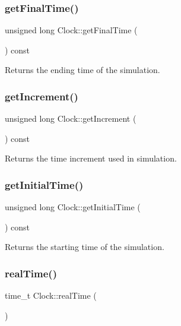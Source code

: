 \subsubsection{\texorpdfstring{get\+Final\+Time()}{getFinalTime()}}
{\footnotesize\ttfamily unsigned long Clock\+::get\+Final\+Time (\begin{DoxyParamCaption}{ }\end{DoxyParamCaption}) const}

\begin{DoxyReturn}{Returns}
the ending time of the simulation. 
\end{DoxyReturn}
\mbox{\label{class_clock_a804626d5455f4a2a73321f84ed7a9819}} 
\subsubsection{\texorpdfstring{get\+Increment()}{getIncrement()}}
{\footnotesize\ttfamily unsigned long Clock\+::get\+Increment (\begin{DoxyParamCaption}{ }\end{DoxyParamCaption}) const}

\begin{DoxyReturn}{Returns}
the time increment used in simulation. 
\end{DoxyReturn}
\mbox{\label{class_clock_a9792f62fed3c320abecc5c455b13a804}} 
\subsubsection{\texorpdfstring{get\+Initial\+Time()}{getInitialTime()}}
{\footnotesize\ttfamily unsigned long Clock\+::get\+Initial\+Time (\begin{DoxyParamCaption}{ }\end{DoxyParamCaption}) const}

\begin{DoxyReturn}{Returns}
the starting time of the simulation. 
\end{DoxyReturn}
\mbox{\label{class_clock_a29512d39298cafed334d0c01da70ea7b}} 
\subsubsection{\texorpdfstring{real\+Time()}{realTime()}}
{\footnotesize\ttfamily time\+\_\+t Clock\+::real\+Time (\begin{DoxyParamCaption}{ }\end{DoxyParamCaption})}

